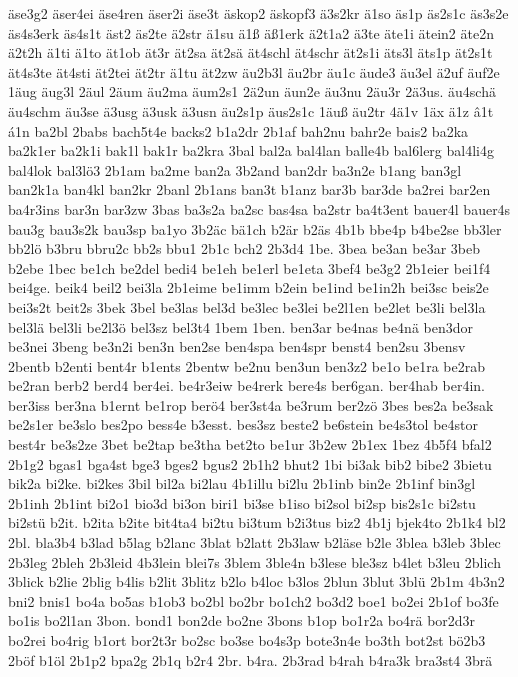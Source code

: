 {äse3g2
äser4ei
äse4ren
äser2i
äse3t
äskop2
äskopf3
ä3s2kr
ä1so
äs1p
äs2s1c
äs3s2e
äs4s3erk
äs4s1t
äst2
äs2te
ä2str
ä1su
ä1ß
äß1erk
ä2t1a2
ä3te
äte1i
ätein2
äte2n
ä2t2h
ä1ti
ä1to
ät1ob
ät3r
ät2sa
ät2sä
ät4schl
ät4schr
ät2s1i
äts3l
äts1p
ät2s1t
ät4s3te
ät4sti
ät2tei
ät2tr
ä1tu
ät2zw
äu2b3l
äu2br
äu1c
äude3
äu3el
ä2uf
äuf2e
1äug
äug3l
2äul
2äum
äu2ma
äum2s1
2ä2un
äun2e
äu3nu
2äu3r
2ä3us.
äu4schä
äu4schm
äu3se
ä3usg
ä3usk
ä3usn
äu2s1p
äus2s1c
1äuß
äu2tr
4ä1v
1äx
ä1z
â1t
á1n
ba2bl
2babs
bach5t4e
backs2
b1a2dr
2b1af
bah2nu
bahr2e
bais2
ba2ka
ba2k1er
ba2k1i
bak1l
bak1r
ba2kra
3bal
bal2a
bal4lan
balle4b
bal6lerg
bal4li4g
bal4lok
bal3lö3
2b1am
ba2me
ban2a
3b2and
ban2dr
ba3n2e
b1ang
ban3gl
ban2k1a
ban4kl
ban2kr
2banl
2b1ans
ban3t
b1anz
bar3b
bar3de
ba2rei
bar2en
ba4r3ins
bar3n
bar3zw
3bas
ba3s2a
ba2sc
bas4sa
ba2str
ba4t3ent
bauer4l
bauer4s
bau3g
bau3s2k
bau3sp
ba1yo
3b2äc
bä1ch
b2är
b2äs
4b1b
bbe4p
b4be2se
bb3ler
bb2lö
b3bru
bbru2c
bb2s
bbu1
2b1c
bch2
2b3d4
1be.
3bea
be3an
be3ar
3beb
b2ebe
1bec
be1ch
be2del
bedi4
be1eh
be1erl
be1eta
3bef4
be3g2
2b1eier
bei1f4
bei4ge.
beik4
beil2
bei3la
2b1eime
be1imm
b2ein
be1ind
be1in2h
bei3sc
beis2e
bei3s2t
beit2s
3bek
3bel
be3las
bel3d
be3lec
be3lei
be2l1en
be2let
be3li
bel3la
bel3lä
bel3li
be2l3ö
bel3sz
bel3t4
1bem
1ben.
ben3ar
be4nas
be4nä
ben3dor
be3nei
3beng
be3n2i
ben3n
ben2se
ben4spa
ben4spr
benst4
ben2su
3bensv
2bentb
b2enti
bent4r
b1ents
2bentw
be2nu
ben3un
ben3z2
be1o
be1ra
be2rab
be2ran
berb2
berd4
ber4ei.
be4r3eiw
be4rerk
bere4s
ber6gan.
ber4hab
ber4in.
ber3iss
ber3na
b1ernt
be1rop
berö4
ber3st4a
be3rum
ber2zö
3bes
bes2a
be3sak
be2s1er
be3slo
bes2po
bess4e
b3esst.
bes3sz
beste2
be6stein
be4s3tol
be4stor
best4r
be3s2ze
3bet
be2tap
be3tha
bet2to
be1ur
3b2ew
2b1ex
1bez
4b5f4
bfal2
2b1g2
bgas1
bga4st
bge3
bges2
bgus2
2b1h2
bhut2
1bi
bi3ak
bib2
bibe2
3bietu
bik2a
bi2ke.
bi2kes
3bil
bil2a
bi2lau
4b1illu
bi2lu
2b1inb
bin2e
2b1inf
bin3gl
2b1inh
2b1int
bi2o1
bio3d
bi3on
biri1
bi3se
b1iso
bi2sol
bi2sp
bis2s1c
bi2stu
bi2stü
b2it.
b2ita
b2ite
bit4ta4
bi2tu
bi3tum
b2i3tus
biz2
4b1j
bjek4to
2b1k4
bl2
2bl.
bla3b4
b3lad
b5lag
b2lanc
3blat
b2latt
2b3law
b2läse
b2le
3blea
b3leb
3blec
2b3leg
2bleh
2b3leid
4b3lein
blei7s
3blem
3ble4n
b3lese
ble3sz
b4let
b3leu
2blich
3blick
b2lie
2blig
b4lis
b2lit
3blitz
b2lo
b4loc
b3los
2blun
3blut
3blü
2b1m
4b3n2
bni2
bnis1
bo4a
bo5as
b1ob3
bo2bl
bo2br
bo1ch2
bo3d2
boe1
bo2ei
2b1of
bo3fe
bo1is
bo2l1an
3bon.
bond1
bon2de
bo2ne
3bons
b1op
bo1r2a
bo4rä
bor2d3r
bo2rei
bo4rig
b1ort
bor2t3r
bo2sc
bo3se
bo4s3p
bote3n4e
bo3th
bot2st
bö2b3
2böf
b1öl
2b1p2
bpa2g
2b1q
b2r4
2br.
b4ra.
2b3rad
b4rah
b4ra3k
bra3st4
3brä
}
